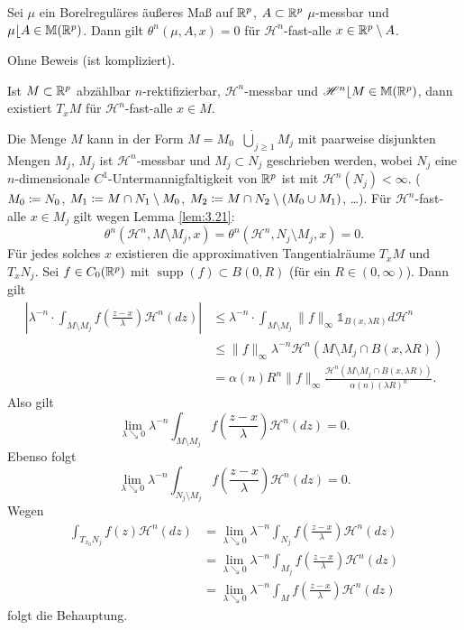 \documentclass[a4paper,twoside,DIV15,BCOR12mm]{scrbook}
\newcommand{\ind}{\mathds 1}
\newcommand{\HM}{\mathscr H}
\DeclareMathOperator{\supp}{supp}
\DeclareMathOperator{\downto}{\searrow}
\newcommand{\MR}{\lfloor}
\begin{document}
\begin{lemma}\label{lem:3.21}
Sei \(\mu\) ein Borelreguläres äußeres Maß auf \(\mathbb{R}^p\), \(A \subset \mathbb{R}^p\) \(\mu\)-messbar und \(\mu\MR A\in \mathbb{M}(\MdR^p)\). Dann gilt \(\theta^n(\mu,A,x)=0\) für \(\HM^n\)-fast-alle \(x\in\mathbb{R}^p\setminus A\).
\end{lemma}
Ohne Beweis (ist kompliziert).

\begin{proposition}\label{prop:3.22}
Ist \(M \subset \mathbb{R}^p\) abzählbar \(n\)-rektifizierbar, \(\HM^n\)-messbar und \(\HM^n\MR M \in \mathbb{M}(\MdR^p)\), dann existiert \(T_x M\) für \(\HM^n\)-fast-alle \(x \in M\).
\end{proposition}

\begin{beweis}
Die Menge \(M\) kann in der Form \(M = M_0 \mathop{\dot\cup} {\dot\bigcup}_{j\geq 1} M_j\) mit paarweise disjunkten Mengen \(M_j\), \(M_j\) ist \(\HM^n\)-messbar und \(M_j \subset N_j\) geschrieben werden, wobei \(N_j\) eine \(n\)-dimensionale \(C^1\)-Untermannigfaltigkeit von \(\mathbb{R}^p\) ist mit \(\HM^n(N_j)<\infty\). (\(M_0 \da N_0\), \(M_1 \da M \cap N_1 \setminus M_0\), \(M_2 \da M \cap N_2 \setminus (M_0 \cup M_1)\), \dots). Für \(\HM^n\)-fast-alle \(x \in M_j\) gilt wegen Lemma \ref{lem:3.21}:
\[
\theta^n(\HM^n, M \setminus M_j, x) = \theta^n(\HM^n, N_j \setminus M_j, x) = 0.
\]
Für jedes solches \(x\) existieren die approximativen Tangentialräume \(T_x M\) und \(T_x N_j\). Sei \(f \in C_0(\mathbb{R}^p)\) mit \(\supp(f) \subset B(0,R)\) (für ein \(R \in (0,\infty)\)). Dann gilt
\begin{align*}
\left| \lambda^{-n} \cdot \int_{M\setminus M_j} f(\frac{z-x}\lambda) \HM^n(dz) \right| &\leq \lambda^{-n} \cdot \int_{M\setminus M_j} \|f\|_\infty \ind_{B(x,\lambda R)} d\HM^n \\
&\leq \|f\|_\infty \lambda^{-n} \HM^n(M\setminus M_j\cap B(x,\lambda R)) \\
&= \alpha(n) R^n \|f\|_\infty \frac{\HM^n (M\setminus M_j \cap B(x,\lambda R))}{\alpha(n) (\lambda R)^n}.
\end{align*}
Also gilt
\[\lim_{\lambda \downto 0} \lambda^{-n} \int_{M\setminus M_j} f(\frac{z-x}\lambda) \HM^n (dz) = 0.
\] 
Ebenso folgt
\[
\lim_{\lambda\downto0} \lambda^{-n} \int_{N_j\setminus M_j} f(\frac{z-x}\lambda) \HM^n(dz) = 0.
\]
Wegen
\begin{align*}
\int_{T_{x_0}N_j} f(z) \HM^n(dz) &= \lim_{\lambda\downto0} \lambda^{-n}\int_{N_j} f(\frac{z-x}\lambda) \HM^n(dz) \\
&= \lim_{\lambda\downto0} \lambda^{-n} \int_{M_j} f(\frac{z-x}\lambda)\HM^n(dz) \\
&= \lim_{\lambda\downto0} \lambda^{-n} \int_M f(\frac{z-x}\lambda) \HM^n(dz)
\end{align*}
folgt die Behauptung.
\end{beweis}
\end{document}
